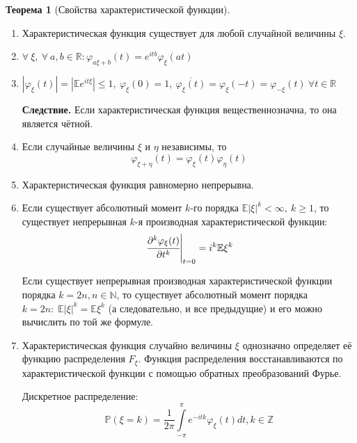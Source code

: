 \documentclass[oneside,final,14pt]{extreport}
\newcommand\mycon{{\bf Следствие.}}
\theoremstyle{plain}
\theoremstyle{definition}
\theoremstyle{named}
\newtheorem*{namedthm}{Теорема}
\begin{document}
\begin{namedthm}[Свойства характеристической функции]\leavevmode
    \begin{enumerate}
        \item Характеристическая функция существует для любой случайной величины $\xi$.
        \item $\forall~ \xi,~ \forall~ a, b \in \mathbb{R} \colon \varphi_{a \xi + b}(t) = e^{itb} \varphi_{\xi}(at)$
        \item $|\varphi_{\xi}(t)|=|\mathbb{E} e^{i t \xi}| \leqslant 1,~ \varphi_{\xi}(0) = 1, ~\overline{\varphi_{\xi}(t)} = \varphi_{\xi}(-t) = \varphi_{-\xi}(t) ~\forall t \in \mathbb{R}$
        
        \mycon{}
        Если характеристическая функция вещественнозначна, то она является чётной.
        
        \item Если случайные величины $\xi$ и $\eta$ независимы, то
        \begin{equation*}
            \varphi_{\xi + \eta}(t) = \varphi_{\xi}(t) \varphi_{\eta}(t)
        \end{equation*}
        \item Характеристическая функция равномерно непрерывна.
        \item Если существует абсолютный момент $k$-го порядка $\mathbb{E}|\xi|^{k} < \infty,~ k \geqslant 1$, то существует непрерывная $k$-я производная характеристической функции:
        \begin{equation*}
            \left.\cfrac{\partial^{k} \varphi_{\xi}(t)}{\partial t^{k}}\right|_{t=0}= i^{k} \mathbb{E} \xi^{k}
        \end{equation*}
        
        Если существует непрерывная производная характеристической функции порядка $k = 2n, n \in \mathbb{N}$, то существует абсолютный момент порядка $k = 2n: \; \mathbb{E}|\xi|^k = \mathbb{E}\xi^k$ (а следовательно, и все предыдущие) и его можно вычислить по той же формуле.
        
        \item Характеристическая функция случайно величины $\xi$ однозначно определяет её функцию распределения $F_{\xi}$. Функция распределения восстанавливаются по характеристической функции с помощью обратных преобразований Фурье.
        
        Дискретное распределение:
        \begin{equation*}
            \mathbb{P}(\xi=k)=\frac{1}{2 \pi} \int\limits_{-\pi}^{\pi} e^{-i t k} \varphi_{\xi}(t) d t, k \in \mathbb{Z}
        \end{equation*}
        

\end{enumerate}
\end{namedthm}
\end{document}
